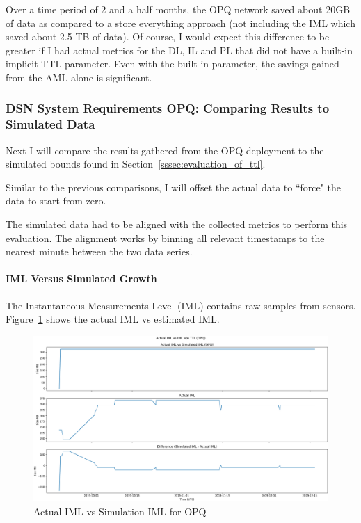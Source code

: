 Over a time period of 2 and a half months, the OPQ network saved about 20GB of data as compared to a store everything approach (not including the IML which saved about 2.5 TB of data). Of course, I would expect this difference to be greater if I had actual metrics for the DL, IL and PL that did not have a built-in implicit TTL parameter. Even with the built-in parameter, the savings gained from the AML alone is significant.

\subsubsection{DSN System Requirements OPQ: Comparing Results to Simulated Data}

Next I will compare the results gathered from the OPQ deployment to the simulated bounds found in Section~\ref{sssec:evaluation_of_ttl}.

Similar to the previous comparisons, I will offset the actual data to ``force" the data to start from zero.

The simulated data had to be aligned with the collected metrics to perform this evaluation. The alignment works by binning all relevant timestamps to the nearest minute between the two data series.

\paragraph{IML Versus Simulated Growth}
The Instantaneous Measurements Level (IML) contains raw samples from sensors. Figure~\ref{fig:actual_iml_vs_sim_opq} shows the actual IML vs estimated IML.

\begin{figure}[H]
    \centering
    \includegraphics[width=\linewidth]{figures/actual_iml_vs_sim_opq.png}
    \caption{Actual IML vs Simulation IML for OPQ}
    \label{fig:actual_iml_vs_sim_opq}
\end{figure}

